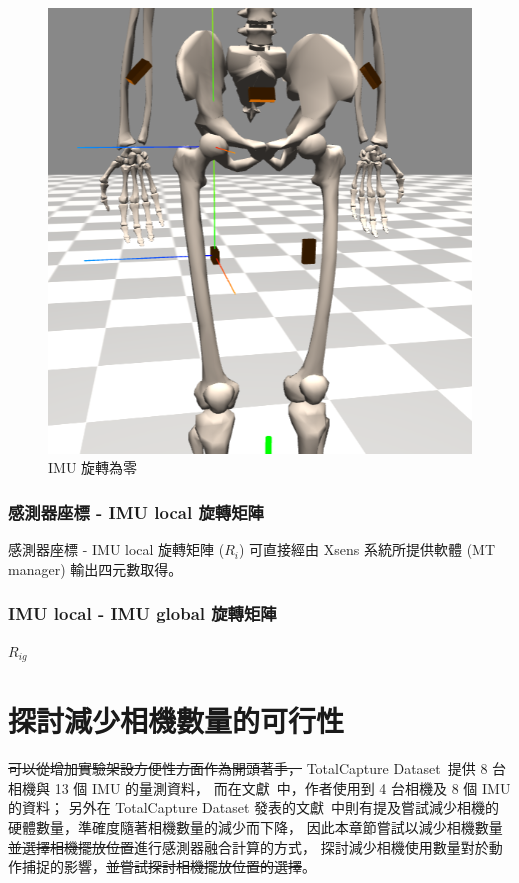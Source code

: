 \begin{figure}[!ht]
\begin{minipage}{.3\textwidth}
   \end{minipage}%
   \begin{minipage}{.3\textwidth}
      \centering
      \includegraphics[width=.8\linewidth, height=.8\linewidth]{figure/ch3_fig_imu_rot.png}
      \caption[IMU 旋轉為零]{IMU 旋轉為零}
      \label{ch3_fig_imu_rot}
    \end{minipage}
\end{figure}

\subsubsection{感測器座標 - IMU local 旋轉矩陣}
感測器座標 - IMU local 旋轉矩陣 ($R_i$) 可直接經由 Xsens 系統所提供軟體 (MT manager) 輸出四元數取得。 

\subsubsection{IMU local - IMU global 旋轉矩陣}
$R_{ig}$

\section{探討減少相機數量的可行性}
\sout{可以從增加實驗架設方便性方面作為開頭著手，}
TotalCapture Dataset~\cite{Trumble:BMVC:2017}提供 8 台相機與 13 個 IMU 的量測資料，
而在文獻~\cite{zhang2020fusing}中，作者使用到 4 台相機及 8 個 IMU 的資料；
另外在 TotalCapture Dataset 發表的文獻~\cite{trumble2017total}中則有提及嘗試減少相機的硬體數量，準確度隨著相機數量的減少而下降，
因此本章節嘗試以減少相機數量\sout{並選擇相機擺放位置}進行感測器融合計算的方式，
探討減少相機使用數量對於動作捕捉的影響，\sout{並嘗試探討相機擺放位置的選擇}。

